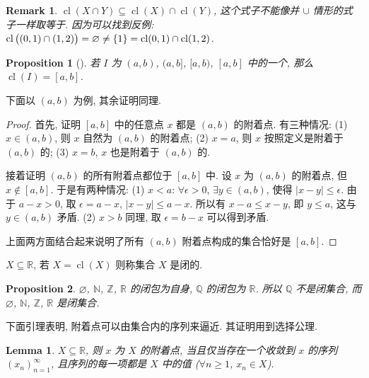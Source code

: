 \documentclass[UTF8]{ctexart}
\theoremstyle{mystyle}
\newtheorem{lemma}{Lemma}[section]
\newtheorem{proposition}{Proposition}[section]
\theoremstyle{myremark}
\newtheorem*{remark}{Remark}
\theoremstyle{plain}
\newcommand{\R}{\mathbb R}
\newcommand{\Z}{\mathbb Z}
\newcommand{\N}{\mathbb N}
\newcommand{\Q}{\mathbb Q}
\DeclarePairedDelimiter\set{\{}{\}}
\DeclareMathOperator{\cl}{cl}
\begin{document}
\begin{remark}
    $ \cl(X \cap Y) \subseteq \cl(X) \cap \cl(Y) $, 这个式子不能像并 $ \cup $ 情形的式子一样取等于. 因为可以找到反例: $ \cl \big( (0, 1) \cap (1, 2) \big) = \varnothing \neq \set{1} = \cl(0, 1) \cap \cl(1, 2) $.
\end{remark}

\begin{proposition}[]
    若 $ I $ 为 $ (a, b) $, $ (a, b] $, $ [a, b) $, $ [a, b] $ 中的一个, 那么 $ \cl (I) = [a, b] $.
\end{proposition}

下面以 $ (a, b) $ 为例, 其余证明同理.
\begin{proof}
    首先, 证明 $ [a, b] $ 中的任意点 $ x $ 都是 $ (a, b) $ 的附着点. 有三种情况: (1) $ x \in (a, b) $, 则 $ x $ 自然为 $ (a, b) $ 的附着点; (2) $ x = a $, 则 $ x $ 按照定义是附着于 $ (a, b) $ 的; (3) $ x = b $, $ x $ 也是附着于 $ (a, b) $ 的.

    接着证明 $ (a, b) $ 的所有附着点都位于 $ [a, b] $ 中. 设 $ x $ 为 $ (a, b) $ 的附着点, 但 $ x \notin [a, b] $. 于是有两种情况: (1) $ x < a $: $ \forall \epsilon > 0 $, $ \exists y \in (a, b) $, 使得 $ |x - y| \leqslant \epsilon $. 由于 $ a - x > 0 $, 取 $ \epsilon = a - x $, $ |x - y| \leqslant a - x $. 所以有 $ x - a \leqslant x - y $, 即 $ y \leqslant a $, 这与 $ y \in (a, b) $ 矛盾. (2) $ x > b $ 同理, 取 $ \epsilon = b - x $ 可以得到矛盾.

    上面两方面结合起来说明了所有 $ (a, b) $ 附着点构成的集合恰好是 $ [a, b] $.
\end{proof}

\begin{definition}
    $ X \subseteq \R $, 若 $ X = \cl(X) $ 则称集合 $ X $ 是闭的.
\end{definition}

\begin{proposition}
    $ \varnothing $, $ \N $, $ \Z $, $ \R $ 的闭包为自身, $ \Q $ 的闭包为 $ \R $. 所以 $ \Q $ 不是闭集合, 而 $ \varnothing $, $ \N $, $ \Z $, $ \R $ 是闭集合.
\end{proposition}

下面引理表明, 附着点可以由集合内的序列来逼近. 其证明用到选择公理.
\begin{lemma}
    $ X \subseteq \R $, 则 $ x $ 为 $ X $ 的附着点, 当且仅当存在一个收敛到 $ x $ 的序列 $ (x_n)_{n = 1}^\infty $, 且序列的每一项都是 $ X $ 中的值 ($ \forall n \geqslant 1 $, $ x_n \in X $).
\end{lemma}
\end{document}
